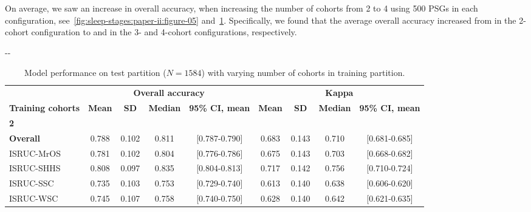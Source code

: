 On average, we saw an increase in overall accuracy, when increasing the number of cohorts from 2 to 4 using 500 \acp{PSG} in each configuration, see~\cref{fig:sleep-stages:paper-ii:figure-05} and~\cref{tab:sleep-stages:paper-ii:table-s04}.
Specifically, we found that the average overall accuracy increased from  in the 2-cohort configuration to  and  in the 3- and 4-cohort configurations, respectively.

\begin{table}
\begin{adjustwidth*}{}{-\marginparwidth-\marginparsep}
\begin{threeparttable}
\footnotesize
\caption[\acs{MASSC}v2 test performance.]{Model performance on test partition (\(N=1584\)) with varying number of cohorts in training partition.}
\label{tab:sleep-stages:paper-ii:table-s04}
\begin{tabular}{@{}lcccccccc@{}}
\toprule
                          & \multicolumn{4}{c}{\textbf{Overall accuracy}}                         & \multicolumn{4}{c}{\textbf{Kappa}}                                    \\ \cline{2-9}
\textbf{Training cohorts} & \textbf{Mean} & \textbf{SD} & \textbf{Median} & \textbf{95\% CI, mean} & \textbf{Mean} & \textbf{SD} & \textbf{Median} & \textbf{95\% CI, mean} \\ \midrule
\textbf{2}                &               &             &                 &                       &               &             &                 &                       \\
\textbf{Overall}          & 0.788         & 0.102       & 0.811           & [0.787-0.790]         & 0.683         & 0.143       & 0.710           & [0.681-0.685]         \\
\acs{ISRUC}-\acs{MrOS}                & 0.781         & 0.102       & 0.804           & [0.776-0.786]         & 0.675         & 0.143       & 0.703           & [0.668-0.682]         \\
\acs{ISRUC}-\acs{SHHS}                & 0.808         & 0.097       & 0.835           & [0.804-0.813]         & 0.717         & 0.142       & 0.756           & [0.710-0.724]         \\
\acs{ISRUC}-\acs{SSC}                 & 0.735         & 0.103       & 0.753           & [0.729-0.740]         & 0.613         & 0.140       & 0.638           & [0.606-0.620]         \\
\acs{ISRUC}-\acs{WSC}                 & 0.745         & 0.107       & 0.758           & [0.740-0.750]         & 0.628         & 0.140       & 0.642           & [0.621-0.635]         \\

\end{tabular}
\end{threeparttable}
\end{adjustwidth*}
\end{table}
